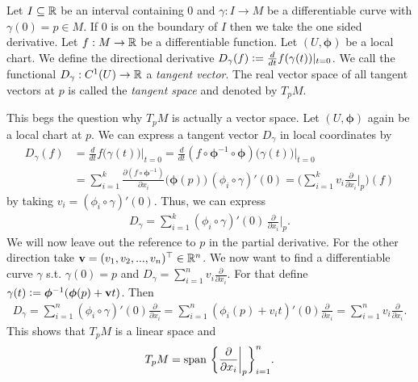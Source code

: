 \documentclass[../master_thesis.tex]{subfiles}
\begin{document}
\begin{definition}
    Let $I \subseteq \mathbb{R}$ be an interval containing $0$ and 
    $\gamma: I \rightarrow M$ be a differentiable curve with $\gamma(0) = p \in M$.
    If $0$ is on the boundary of $I$ then we take the one sided derivative.
    Let $f:M \rightarrow \mathbb{R}$ be a differentiable function. Let
    $(U, \boldsymbol{\phi})$ be a local chart.
    We define the directional derivative 
    $D_\gamma(f) \vcentcolon= \frac{d}{dt} f(\gamma(t)) |_{t=0}$.
    We call the functional $D_\gamma: C^1(U) \rightarrow \mathbb{R}$ 
    a \textit{tangent vector}. 
    The real vector space of all tangent vectors at $p$ is called the 
    \textit{tangent space} and denoted by $T_p M$.
\end{definition}
This begs the question why $T_p M$ is actually a vector space. Let $(U,\boldsymbol{\phi})$ 
again be a local chart at $p$.
We can 
express a tangent vector $D_\gamma$ in local coordinates by 
\begin{align}
    D_\gamma(f) &=  \frac{d}{dt} f\big(\gamma(t)\big) \big|_{t=0}
    =  \frac{d}{dt} (f \circ \boldsymbol{\phi}^{-1} \circ \boldsymbol{\phi})  \big(\gamma(t)\big) \big|_{t=0}
    \\ &= \sum\limits_{i=1}^k \frac{\partial (f \circ \boldsymbol{\phi}^{-1})}{\partial x_i} 
        \big(\boldsymbol{\phi}(p)\big)
        \, (\phi_i\circ \gamma)'(0)
    = \Big(\sum\limits_{i=1}^k v_i  \frac{\partial}{\partial x_i}\Big|_p \Big)(f)
\end{align}
by taking $v_i = (\phi_i\circ \gamma)'(0)$. Thus, we can express 
\begin{align*}
    D_\gamma = \sum\limits_{i=1}^k 
    (\phi_i \circ \gamma)' (0) \, \frac{\partial}{\partial x_i}\bigg|_p.
\end{align*}
We will now leave out the reference to $p$ in the partial derivative.
For the other direction take $\mathbf{v} = (v_1, v_2, ..., v_n)^\top \in \mathbb{R}^n$. 
We now want to find a differentiable curve $\gamma$ s.t. $\gamma(0) = p$ 
and $D_\gamma = \sum_{i=1}^n v_i \frac{\partial}{\partial x_i}$.
For that define $\gamma(t) \vcentcolon= \boldsymbol{\phi}^{-1} (\boldsymbol{\phi}(p) + \mathbf{v}t)$.
Then
\begin{align*}
    D_\gamma = \sum_{i=1}^n (\phi_i\circ \gamma)'(0) \frac{\partial}{\partial x_i}
    = \sum_{i=1}^n (\phi_i(p) + v_i t)'(0) \frac{\partial}{\partial x_i}
    = \sum_{i=1}^n v_i \frac{\partial}{\partial x_i}.
\end{align*}
This shows that $T_p M$ is a linear space and 
\begin{align*}
    T_p M = \operatorname{span}\, 
        \bigg\{ \frac{\partial}{\partial x_i}\bigg|_p \bigg\}_{i=1}^n.
\end{align*}
\end{document}
